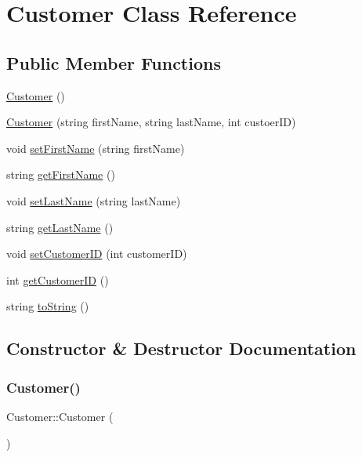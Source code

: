 \hypertarget{class_customer}{}\section{Customer Class Reference}
\label{class_customer}
\subsection*{Public Member Functions}
\begin{DoxyCompactItemize}
\item 
\hyperlink{class_customer_abcc8fae9701e5ba9d7d6fe44498b34e3}{Customer} ()
\item 
\hyperlink{class_customer_a0e0e31707d01bf721067c7a73b5bea8c}{Customer} (string first\+Name, string last\+Name, int custoer\+ID)
\item 
void \hyperlink{class_customer_aad7bbf65329d9ad4bc4a99cb5ed8fdbd}{set\+First\+Name} (string first\+Name)
\item 
string \hyperlink{class_customer_a406993fb9cf665aa2b44355de7c12d58}{get\+First\+Name} ()
\item 
void \hyperlink{class_customer_a16bda3871286ed4ff13400dbd988790a}{set\+Last\+Name} (string last\+Name)
\item 
string \hyperlink{class_customer_aef91fec461e6d0ad72ef3162b8711b76}{get\+Last\+Name} ()
\item 
void \hyperlink{class_customer_af17373c7df70e19949f35274bef0071e}{set\+Customer\+ID} (int customer\+ID)
\item 
int \hyperlink{class_customer_a236d5d040cafabeb6f84296d3e101ff1}{get\+Customer\+ID} ()
\item 
string \hyperlink{class_customer_a09a36773263493f72efc4b3f02648c03}{to\+String} ()
\end{DoxyCompactItemize}


\subsection{Constructor \& Destructor Documentation}
\mbox{\label{class_customer_abcc8fae9701e5ba9d7d6fe44498b34e3}} 
\subsubsection{\texorpdfstring{Customer()}{Customer()}\hspace{0.1cm}{\footnotesize\ttfamily [1/2]}}
{\footnotesize\ttfamily Customer\+::\+Customer (\begin{DoxyParamCaption}{ }\end{DoxyParamCaption})}

